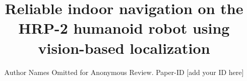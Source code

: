 \documentclass[conference]{IEEEtran}
\begin{document}
\title{Reliable indoor navigation on the HRP-2 humanoid robot using
  vision-based localization}

\author{Author Names Omitted for Anonymous Review. Paper-ID [add your ID here]}





%

\end{document}
